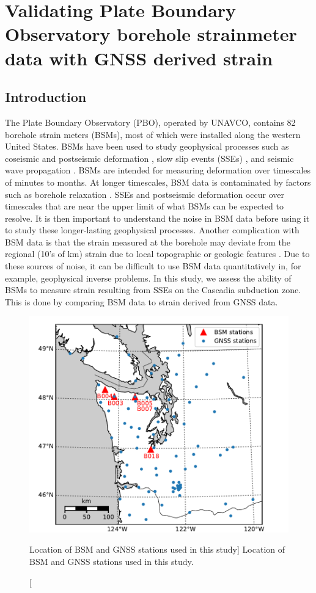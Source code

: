 \chapter{Validating Plate Boundary Observatory borehole
strainmeter data with GNSS derived strain}

\section{Introduction}

The Plate Boundary Observatory (PBO), operated by UNAVCO, contains 82
borehole strain meters (BSMs), most of which were installed along the
western United States. BSMs have been used to study geophysical
processes such as coseismic and postseismic deformation
\citep[e.g.,][]{Langbein2006, Langbein2015}, slow slip events (SSEs)
\citep[e.g.,][]{Dragert2011}, and seismic wave propagation
\citep{Barbour2017}. BSMs are intended for measuring deformation over
timescales of minutes to months. At longer timescales, BSM data is
contaminated by factors such as borehole relaxation
\citep{Gladwin1987}. SSEs and postseismic deformation occur over
timescales that are near the upper limit of what BSMs can be expected to
resolve. It is then important to understand the noise in BSM data
before using it to study these longer-lasting geophysical processes.
Another complication with BSM data is that the strain measured at the
borehole may deviate from the regional (10's of km) strain due to local
topographic or geologic features \citep{Berger1976}. Due to these
sources of noise, it can be difficult to use BSM data quantitatively
in, for example, geophysical inverse problems. In this study, we
assess the ability of BSMs to measure strain resulting from SSEs on
the Cascadia subduction zone. This is done by comparing BSM data to
strain derived from GNSS data.

\begin{figure}
\includegraphics{ch6/figures/map.pdf}
\caption
[Location of BSM and GNSS stations used in this study]
{Location of BSM and GNSS stations used in this study.}   
\label{ch6:fig:Map}
\end{figure}

